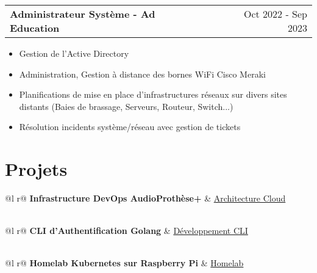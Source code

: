 \documentclass[a4paper,11pt]{article}
\makeatletter
\newenvironment{joblong}[2]
    {
    \begin{tabularx}{\linewidth}{@{}l X r@{}}
    \textbf{#1} & \hfill &  #2 \\[2pt]
    \end{tabularx}
    \begin{minipage}[t]{\linewidth}
    \begin{itemize}[nosep,after=\strut, leftmargin=1em, itemsep=2pt,label=--]
    }
    {
    \end{itemize}
    \end{minipage}    
    }
\makeatother
\begin{document}
\begin{joblong}{Administrateur Système - Ad Education}{Oct 2022 - Sep 2023}
\item Gestion de l'Active Directory
\item Administration, Gestion à distance des bornes WiFi Cisco Meraki
\item Planifications de mise en place d'infrastructures réseaux sur divers sites distants (Baies de brassage, Serveurs, Routeur, Switch...)
\item Résolution incidents système/réseau avec gestion de tickets
\end{joblong}
  
\section{Projets}

\begin{tabularx}{\linewidth}{ @{}l r@{} }
\textbf{Infrastructure DevOps AudioProthèse+} & \hfill \href{https://portfolio.alaincheng.com/projects/audioprothese-plus.html}{Architecture Cloud} \\[2pt]
  \\
\end{tabularx}

\begin{tabularx}{\linewidth}{ @{}l r@{} }
\textbf{CLI d'Authentification Golang} & \hfill \href{https://portfolio.alaincheng.com/projects/cli-golang.html}{Développement CLI} \\[2pt]
  \\
\end{tabularx}

\begin{tabularx}{\linewidth}{ @{}l r@{} }
\textbf{Homelab Kubernetes sur Raspberry Pi} & \hfill \href{https://portfolio.alaincheng.com/projects/homelab-k8s.html}{Homelab} \\[2pt]
  \\
\end{tabularx}
\end{document}
